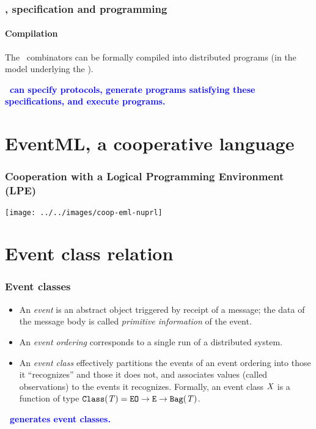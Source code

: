 \documentclass[12pt,red]{beamer}
\newcommand{\cemph}[1]{\textcolor{blue}{\textbf{#1}}}
\begin{document}
\begin{frame}
  \frametitle{\eml, specification and programming}

  \framesubtitle{Compilation}

  The \logicE\ combinators can be formally compiled into
  distributed programs (in the model underlying the \logicE).

  \vspace{0.2in}

  \cemph{\eml\ can specify protocols, generate programs satisfying
    these specifications, and execute programs.}
\end{frame}


\section{EventML, a cooperative language}


\begin{frame}
  \frametitle{Cooperation with a Logical Programming Environment (LPE)}

  \texttt{[image: ../../images/coop-eml-nuprl]}

\end{frame}


\section{Event class relation}


\begin{frame}
  \frametitle{Event classes}

  \begin{itemize}
  \item An \emph{event} is an abstract object triggered by receipt of
    a message; the data of the message body is called \emph{primitive
      information\/} of the event.

  \item An \emph{event ordering} corresponds to a single run of a
    distributed system.

  \item An \emph{event class} effectively partitions the events of an
    event ordering into those it ``recognizes'' and those it does not,
    and associates values (called observations) to the events it
    recognizes.  Formally, an event class $\mathit{X}$ is a function
    of type
    $\mathtt{Class}(\mathit{T})
    =\mathtt{EO}\rightarrow\mathtt{E}\rightarrow\mathtt{Bag}(\mathit{T})
   $.
  \end{itemize}

  \cemph{\eml\ generates event classes.}
\end{frame}
\end{document}
